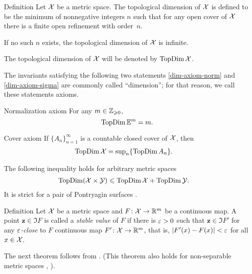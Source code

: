 \begin{thm}{Definition}\label{def:TopDim}
Let $\mathcal{X}$ be a metric space. 
The topological dimension of $\mathcal{X}$ is defined to be the minimum of nonnegative integers $n$ 
such that for any open cover of $\mathcal{X}$ there is a finite open refinement with order~$n$.

If no such $n$ exists, the topological dimension of $\mathcal{X}$ is infinite.

The topological dimension of $\mathcal{X}$ will be denoted by $\mathop{\rm TopDim}\nolimits\mathcal{X}$.
\end{thm}

The invariants satisfying the following two statements \ref{dim-axiom-norm} and \ref{dim-axiom-sigma} are commonly called ``dimension'';
for that reason, we call these statements axioms.

\begin{thm}{Normalization axiom}
\label{dim-axiom-norm} For any $m\in\mathbb{Z}_{\geqslant0}$,
\[\mathop{\rm TopDim}\nolimits\mathbb{E}^m=m.\]

\end{thm}

\begin{thm}{Cover axiom}\label{dim-axiom-sigma} 
If $\{A_n\}_{n=1}^\infty$ is a countable closed cover of $\mathcal{X}$, then
\begin{align*}
\mathop{\rm TopDim}\nolimits \mathcal{X}&=\sup\nolimits_n\{\mathop{\rm TopDim}\nolimits A_n\}.
\end{align*}

\end{thm}

The following inequality holds for arbitrary metric spaces
\begin{align*}
\mathop{\rm TopDim}\nolimits  (\mathcal{X}\times\mathcal{Y})
&\leqslant 
\mathop{\rm TopDim}\nolimits \mathcal{X}+ \mathop{\rm TopDim}\nolimits\mathcal{Y}.
\end{align*}
It is strict for a pair of Pontryagin surfaces \cite{pontyagin-surface}.

\medskip

\begin{thm}{Definition}
Let $\mathcal{X}$ be a metric space
and $F\colon\mathcal{X}\to\mathbb{R}^m$ be  a continuous map.
A point $\bm{z}\in \Im F$ is called a \emph{stable value} of $F$
if there is $\varepsilon>0$ such that $\bm{z}\in\Im F'$ 
for any \emph{$\varepsilon$-close} to $F$ continuous map $F'\colon\mathcal{X}\to\mathbb{R}^m$,
that is, $|F'(x)-F(x)|<\varepsilon$ for all $x\in \mathcal{X}$.
\end{thm}



The next theorem follows from \cite[theorems VI 1$\&$2]{hurewicz-wallman}.
(This theorem also holds for non-separable metric spaces \cite{nagata}, \cite[3.2.10]{engelking}). 

